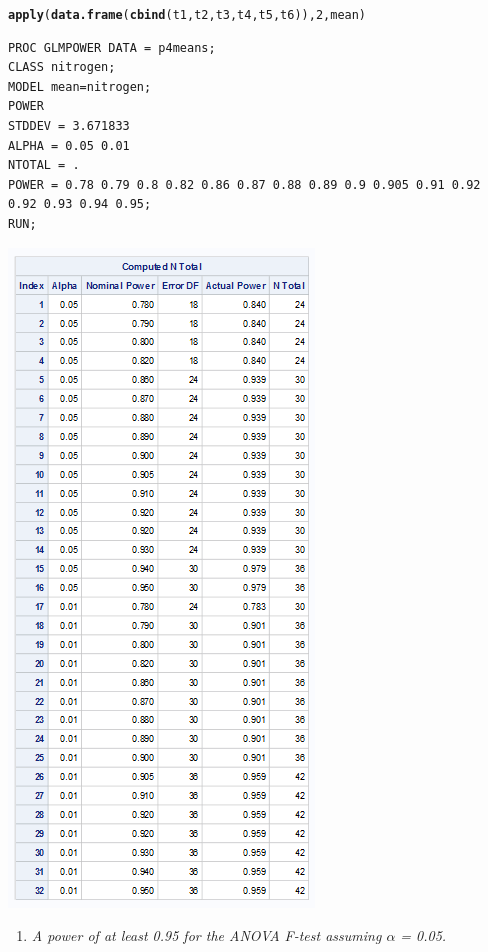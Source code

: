 \documentclass{article}\usepackage[]{graphicx}\usepackage[]{color}
\makeatletter
\newcommand{\hlnum}[1]{\textcolor[rgb]{0.686,0.059,0.569}{#1}}%
\newcommand{\hlstd}[1]{\textcolor[rgb]{0.345,0.345,0.345}{#1}}%
\newcommand{\hlkwd}[1]{\textcolor[rgb]{0.737,0.353,0.396}{\textbf{#1}}}%
\newenvironment{kframe}{%
 \def\at@end@of@kframe{}%
 \ifinner\ifhmode%
  \def\at@end@of@kframe{\end{minipage}}%
  \begin{minipage}{\columnwidth}%
 \fi\fi%
 \def\FrameCommand##1{\hskip\@totalleftmargin \hskip-\fboxsep
 \colorbox{shadecolor}{##1}\hskip-\fboxsep
     \hskip-\linewidth \hskip-\@totalleftmargin \hskip\columnwidth}%
 \MakeFramed {\advance\hsize-\width
   \@totalleftmargin\z@ \linewidth\hsize
   \@setminipage}}%
 {\par\unskip\endMakeFramed%
 \at@end@of@kframe}
\newenvironment{knitrout}{}{} %
\makeatother
\begin{document}
\begin{enumerate}
\begin{knitrout}
\begin{kframe}
\begin{alltt}
\hlkwd{apply}\hlstd{(}\hlkwd{data.frame}\hlstd{(}\hlkwd{cbind}\hlstd{(t1,t2,t3,t4,t5,t6)),} \hlnum{2}\hlstd{, mean)}
\end{alltt}
\end{kframe}
\end{knitrout}

\begin{verbatim}
PROC GLMPOWER DATA = p4means;
CLASS nitrogen;
MODEL mean=nitrogen;
POWER
STDDEV = 3.671833
ALPHA = 0.05 0.01
NTOTAL = .
POWER = 0.78 0.79 0.8 0.82 0.86 0.87 0.88 0.89 0.9 0.905 0.91 0.92 0.92 0.93 0.94 0.95;
RUN;
\end{verbatim}

\begin{center}
\includegraphics[scale=1.25]{prob4power}
\end{center}
\newpage

\begin{enumerate}
\item {\it A power of at least 0.95 for the ANOVA F-test assuming $\alpha$ = 0.05.}


\end{enumerate}
\end{enumerate}
\end{document}
